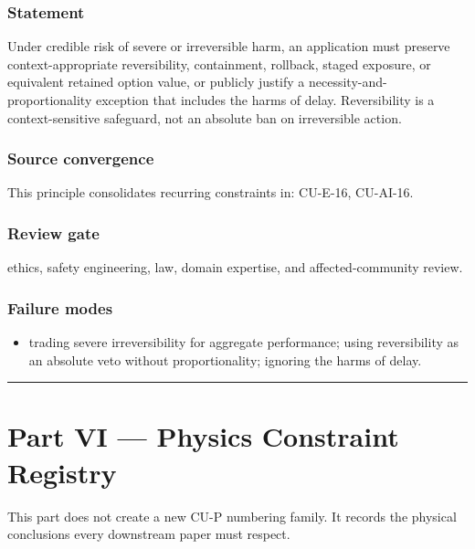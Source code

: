 \documentclass[
  11pt,
]{article}
\providecommand{\tightlist}{%
  \setlength{\itemsep}{0pt}\setlength{\parskip}{0pt}}
\begin{document}
\subsubsection{Statement}\label{statement-57}

Under credible risk of severe or irreversible harm, an application must
preserve context-appropriate reversibility, containment, rollback,
staged exposure, or equivalent retained option value, or publicly
justify a necessity-and-proportionality exception that includes the
harms of delay. Reversibility is a context-sensitive safeguard, not an
absolute ban on irreversible action.

\subsubsection{Source convergence}\label{source-convergence-6}

This principle consolidates recurring constraints in: CU-E-16, CU-AI-16.

\subsubsection{Review gate}\label{review-gate-13}

ethics, safety engineering, law, domain expertise, and
affected-community review.

\subsubsection{Failure modes}\label{failure-modes-30}

\begin{itemize}
\tightlist
\item
  trading severe irreversibility for aggregate performance; using
  reversibility as an absolute veto without proportionality; ignoring
  the harms of delay.
\end{itemize}

\begin{center}\rule{0.5\linewidth}{0.5pt}\end{center}

\section{Part VI --- Physics Constraint
Registry}\label{part-vi-physics-constraint-registry}

This part does not create a new CU-P numbering family. It records the
physical conclusions every downstream paper must respect.
\end{document}
